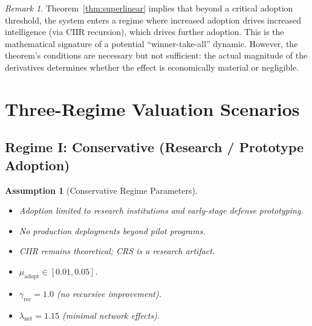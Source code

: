 \documentclass[11pt,a4paper]{article}
\newtheorem{assumption}[definition]{Assumption}
\theoremstyle{remark}
\newtheorem{remark}[definition]{Remark}
\newcommand{\interpretive}[1]{\textcolor{blue!70!black}{#1}}
\begin{document}
\begin{remark}
\interpretive{Theorem~\ref{thm:superlinear} implies that beyond a
critical adoption threshold, the system enters a regime where
increased adoption drives increased intelligence (via CIIR recursion),
which drives further adoption.  This is the mathematical signature of
a potential ``winner-take-all'' dynamic.  However, the theorem's
conditions are necessary but not sufficient: the actual magnitude
of the derivatives determines whether the effect is economically
material or negligible.}
\end{remark}


\section{Three-Regime Valuation Scenarios}
\label{sec:regimes}

\subsection{Regime I: Conservative (Research / Prototype Adoption)}
\label{subsec:conservative}

\begin{assumption}[Conservative Regime Parameters]
\label{ass:conservative}
\begin{itemize}[nosep]
  \item Adoption limited to research institutions and early-stage
        defense prototyping.
  \item No production deployments beyond pilot programs.
  \item CIIR remains theoretical; CRS is a research artifact.
  \item $\mu_{\mathrm{adopt}} \in [0.01, 0.05]$.
  \item $\gamma_{\mathrm{rec}} = 1.0$ (no recursive improvement).
  \item $\lambda_{\mathrm{net}} = 1.15$ (minimal network effects).
\end{itemize}
\end{assumption}
\end{document}
